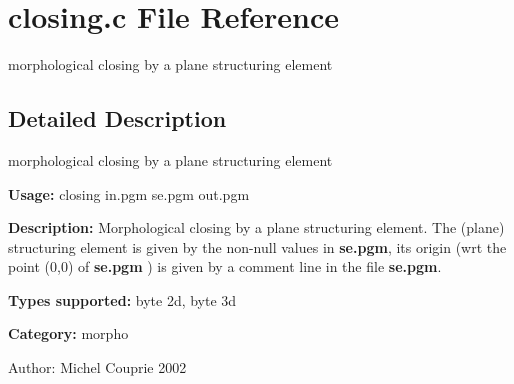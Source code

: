 \section{closing.c File Reference}
\label{closing_8c}
morphological closing by a plane structuring element 



\subsection{Detailed Description}
morphological closing by a plane structuring element 

{\bf Usage:} closing in.pgm se.pgm out.pgm

{\bf Description:} Morphological closing by a plane structuring element. The (plane) structuring element is given by the non-null values in {\bf se.pgm}, its origin (wrt the point (0,0) of {\bf se.pgm} ) is given by a comment line in the file {\bf se.pgm}.

{\bf Types supported:} byte 2d, byte 3d

{\bf Category:} morpho

\begin{Desc}
\item[Author:]Michel Couprie 2002 \end{Desc}
